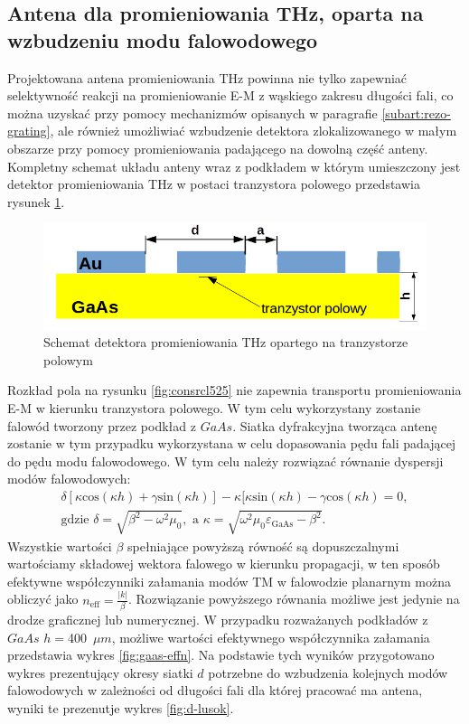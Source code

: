 \subsection{Antena dla promieniowania THz, oparta na wzbudzeniu modu falowodowego}
Projektowana antena promieniowania THz powinna nie tylko zapewniać selektywność reakcji na promieniowanie E-M z wąskiego zakresu długości fali, co można uzyskać przy pomocy mechanizmów opisanych w paragrafie \ref{subart:rezo-grating}, ale również umożliwiać wzbudzenie detektora zlokalizowanego w małym obszarze przy pomocy promieniowania padającego na dowolną część anteny. Kompletny schemat układu anteny wraz z podkładem w którym umieszczony jest detektor promieniowania THz w postaci tranzystora polowego przedstawia rysunek \ref{fig:schem-podklad-falo}.
\begin{figure}
	\centering
	\includegraphics[width=\textwidth]{images/thz/schemat-podklad-falo.png}
	\caption{Schemat detektora promieniowania THz opartego na tranzystorze polowym}
	\label{fig:schem-podklad-falo}
\end{figure}

Rozkład pola na rysunku \ref{fig:consrcl525} nie zapewnia transportu promieniowania E-M w kierunku tranzystora polowego. W tym celu wykorzystany zostanie falowód tworzony przez podkład z $GaAs$. Siatka dyfrakcyjna tworząca antenę zostanie w tym przypadku wykorzystana w celu dopasowania pędu fali padającej do pędu modu falowodowego. W tym celu należy rozwiązać równanie dyspersji modów falowodowych\cite{petykiewicz1989podstawy}:
\begin{equation}
	\begin{gathered}
	\delta [ \kappa \textrm{cos}(\kappa h) + \gamma\textrm{sin}(\kappa h) ] - \kappa [ \kappa \textrm{sin}(\kappa h) - \gamma \textrm{cos}(\kappa h) = 0,\\
	\textrm{gdzie }\delta=\sqrt{\beta^2-\omega^2\mu_0},\textrm{ a }\kappa=\sqrt{\omega^2\mu_0\varepsilon_{\textrm{GaAs}}-\beta^2}.
	\end{gathered}
\end{equation}
Wszystkie wartości $\beta$ spełniające powyższą równość są dopuszczalnymi wartościamy składowej wektora falowego w kierunku propagacji, w ten sposób efektywne współczynniki załamania modów TM w falowodzie planarnym można obliczyć jako $n_{\textrm{eff}}=\frac{|k|}{\beta}$. Rozwiązanie powyższego równania możliwe jest jedynie na drodze graficznej lub numerycznej. W przypadku rozważanych podkładów z $GaAs$ $h=$400~$\mu m$, możliwe wartości efektywnego współczynnika załamania przedstawia wykres \ref{fig:gaas-effn}. Na podstawie tych wyników przygotowano wykres prezentujący okresy siatki $d$ potrzebne do wzbudzenia kolejnych modów falowodowych w zależności od długości fali dla której pracować ma antena, wyniki te prezenutje wykres \ref{fig:d-lusok}.

